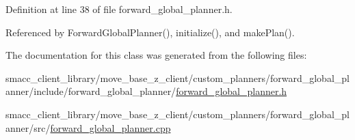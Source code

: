 Definition at line 38 of file forward\+\_\+global\+\_\+planner.\+h.



Referenced by Forward\+Global\+Planner(), initialize(), and make\+Plan().



The documentation for this class was generated from the following files\+:\begin{DoxyCompactItemize}
\item 
smacc\+\_\+client\+\_\+library/move\+\_\+base\+\_\+z\+\_\+client/custom\+\_\+planners/forward\+\_\+global\+\_\+planner/include/forward\+\_\+global\+\_\+planner/\hyperlink{forward__global__planner_8h}{forward\+\_\+global\+\_\+planner.\+h}\item 
smacc\+\_\+client\+\_\+library/move\+\_\+base\+\_\+z\+\_\+client/custom\+\_\+planners/forward\+\_\+global\+\_\+planner/src/\hyperlink{forward__global__planner_8cpp}{forward\+\_\+global\+\_\+planner.\+cpp}\end{DoxyCompactItemize}
